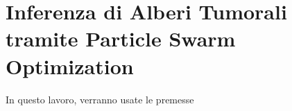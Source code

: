 \chapter{Inferenza di Alberi Tumorali tramite Particle Swarm Optimization}
\label{chap:pso}
In questo lavoro, verranno usate le premesse 

\subsection{}

